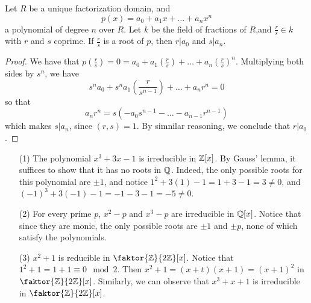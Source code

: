\begin{lemma}\label{lemma_7.3.2}
    Let $R$ be a unique factorization domain, and
    \begin{equation*}
        p(x)=a_0+a_1x+\dots+a_nx^n
    \end{equation*}
    a polynomial of degree $n$ over $R$. Let $k$ be the field of fractions of
    $R$,and $\frac{r}{s} \in k$ with $r$ and $s$ coprime. If $\frac{r}{s}$ is a
    root of $p$, then  $r|a_0$ and $s|a_n$.
\end{lemma}
\begin{proof}
    We have that
    $p(\frac{r}{s})=0=a_0+a_1(\frac{r}{s})+\dots+a_n(\frac{r}{s})^n$.
    Multiplying both sides by $s^n$, we have
    \begin{equation*}
        s^na_0+s^na_1(\frac{r}{s^{n-1}})+\dots+a_nr^n=0
   \end{equation*}
    so that
    \begin{equation*}
        a_nr^n=s(-a_0s^{n-1}- \dots -a_{n-1}r^{n-1})
    \end{equation*}
    which makes $s|a_n$, since $(r,s)=1$. By simnilar reasoning, we conclude that
    $r|a_0$.
\end{proof}

\begin{example}\label{example_7.4}
    \begin{enumerate}
        \item[(1)] The polynomial $x^3+3x-1$ is irreducible in  $\mathbb{Z}[x]$. By
            Gauss' lemma, it suffices to show that it has no roots in $\mathbb{Q}$.
            Indeed, the only possible roots for this polynomial are  $\pm{1}$,
            and notice $1^2+3(1)-1=1+3-1=3 \neq 0$, and
            $(-1)^3+3(-1)-1=-1-3-1=-5 \neq 0$.

        \item[(2)] For every prime $p$,  $x^2-p$ and  $x^3-p$ are irreducible in
             $\mathbb{Q}[x]$. Notice that since they are monic, the only possible roots
             are $\pm{1}$ and $\pm{p}$, none of which satisfy the polynomials.

         \item[(3)] $x^2+1$ is reducible in  $\faktor{\Z}{2\Z}[x]$. Notice that
             $1^2+1=1+1 \equiv 0 \mod{2}$. Then $x^2+1=(x+t)(x+1)=(x+1)^2$ in
             $\faktor{\Z}{2\Z}[x]$. Similarly, we can observe that $x^3+x+1$ is
             irreducible in  $\faktor{\Z}{2\Z}[x]$.
    \end{enumerate}
\end{example}

